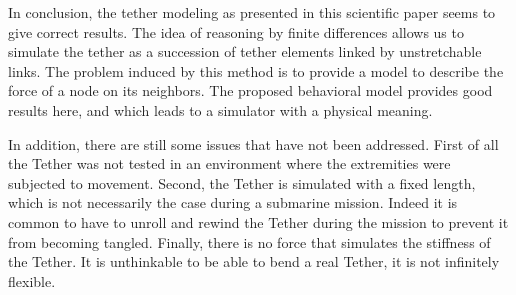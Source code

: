 In conclusion, the tether modeling as presented in this scientific paper seems to give correct results. The idea of reasoning by finite differences allows us to simulate the tether as a succession of tether elements linked by unstretchable links. The problem induced by this method is to provide a model to describe the force of a node on its neighbors. The proposed behavioral model provides good results here, and which leads to a simulator with a physical meaning.

In addition, there are still some issues that have not been addressed. First of all the Tether was not tested in an environment where the extremities were subjected to movement. Second, the Tether is simulated with a fixed length, which is not necessarily the case during a submarine mission. Indeed it is common to have to unroll and rewind the Tether during the mission to prevent it from becoming tangled. Finally, there is no force that simulates the stiffness of the Tether. It is unthinkable to be able to bend a real Tether, it is not infinitely flexible.